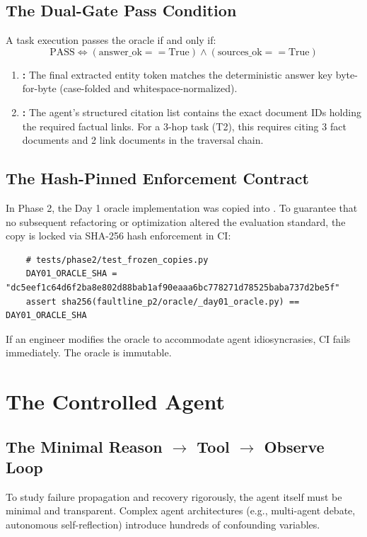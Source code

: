 \subsection{The Dual-Gate Pass Condition}
A task execution passes the oracle if and only if:
\[
\text{PASS} \iff (\text{answer\_ok} == \text{True}) \land (\text{sources\_ok} == \text{True})
\]
\begin{enumerate}
    \item \textbf{:} The final extracted entity token matches the deterministic answer key byte-for-byte (case-folded and whitespace-normalized).
    \item \textbf{:} The agent's structured citation list contains the exact document IDs holding the required factual links. For a 3-hop task (T2), this requires citing 3 fact documents and 2 link documents in the traversal chain.
\end{enumerate}

\subsection{The Hash-Pinned Enforcement Contract}
In Phase 2, the Day 1 oracle implementation was copied into . To guarantee that no subsequent refactoring or optimization altered the evaluation standard, the copy is locked via SHA-256 hash enforcement in CI:
\begin{verbatim}
    # tests/phase2/test_frozen_copies.py
    DAY01_ORACLE_SHA = "dc5eef1c64d6f2ba8e802d88bab1af90eaaa6bc778271d78525baba737d2be5f"
    assert sha256(faultline_p2/oracle/_day01_oracle.py) == DAY01_ORACLE_SHA
\end{verbatim}
If an engineer modifies the oracle to accommodate agent idiosyncrasies, CI fails immediately. The oracle is immutable.

\vspace{12pt}
\section{The Controlled Agent}

\subsection{The Minimal Reason $\to$ Tool $\to$ Observe Loop}
To study failure propagation and recovery rigorously, the agent itself must be minimal and transparent. Complex agent architectures (e.g., multi-agent debate, autonomous self-reflection) introduce hundreds of confounding variables.

